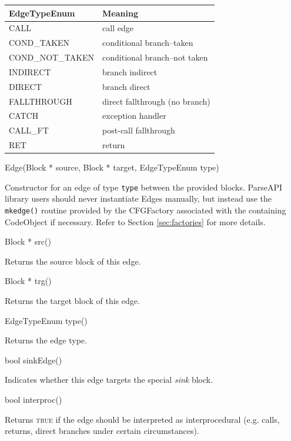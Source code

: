 \documentclass{article}
\newenvironment{apient}{\small\verbatim}{\endverbatim}
\newcommand{\apidesc}[1]{%
{\addtolength{\leftskip}{4em}%
#1\par\medskip}
}
\begin{document}
\begin{center}
\begin{tabular}{ll}
\toprule
EdgeTypeEnum & Meaning \\
\midrule
CALL & call edge \\
COND\_TAKEN & conditional branch--taken \\
COND\_NOT\_TAKEN & conditional branch--not taken \\
INDIRECT & branch indirect \\
DIRECT & branch direct \\
FALLTHROUGH & direct fallthrough (no branch) \\
CATCH & exception handler \\
CALL\_FT & post-call fallthrough \\
RET & return \\
\bottomrule
\end{tabular}
\end{center}

\begin{apient}
Edge(Block * source, Block * target, EdgeTypeEnum type)
\end{apient}
\apidesc{Constructor for an edge of type \texttt{type} between the provided
blocks.  ParseAPI library users should never instantiate Edges manually, but
instead use the \texttt{mkedge()} routine provided by the CFGFactory associated
with the containing CodeObject if necessary. Refer to Section
\ref{sec:factories} for more details.}

\begin{apient}
Block * src()
\end{apient}
\apidesc{Returns the source block of this edge.}

\begin{apient}
Block * trg()
\end{apient}
\apidesc{Returns the target block of this edge.}

\begin{apient}
EdgeTypeEnum type()
\end{apient}
\apidesc{Returns the edge type.}

\begin{apient}
bool sinkEdge()
\end{apient}
\apidesc{Indicates whether this edge targets the special \emph{sink} block.}

\begin{apient}
bool interproc()
\end{apient}
\apidesc{Returns {\scshape true} if the edge should be interpreted as interprocedural (e.g. calls, returns, direct branches under certain circumstances).}
\end{document}
